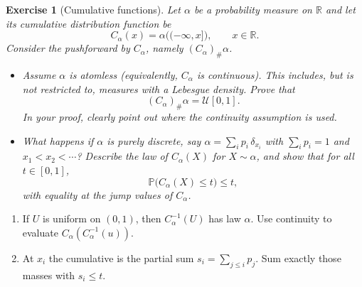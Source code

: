 \documentclass[11pt,a4paper]{article}
\theoremstyle{exostyle}
\newtheorem{exercise}{Exercise}
\newcommand{\push}{\#}
\newcommand{\Unif}{\mathcal U}
\begin{document}
\begin{exercise}[Cumulative functions]\label{ex:PIT}
Let $\alpha$ be a probability measure on $\mathbb{R}$ and let its cumulative distribution function be
\[
C_\alpha(x)=\alpha\bigl((-\infty,x]\bigr),\qquad x\in\mathbb{R}.
\]
Consider the pushforward by $C_\alpha$, namely $(C_\alpha)_{\push}\alpha$.

\begin{itemize}[itemsep=2pt]
\item[(1)] Assume $\alpha$ is atomless (equivalently, $C_\alpha$ is continuous). This includes, but is not restricted to, measures with a Lebesgue density. Prove that
\[
(C_\alpha)_{\push}\alpha=\Unif[0,1].
\]
In your proof, clearly point out \emph{where} the continuity assumption is used.
\item[(2)] What happens if $\alpha$ is purely discrete, say $\alpha=\sum_{i} p_i\,\delta_{x_i}$ with $\sum_i p_i=1$ and $x_1<x_2<\cdots$? Describe the law of $C_\alpha(X)$ for $X\sim\alpha$, and show that for all $t\in[0,1]$,
\[
\mathbb{P}\bigl(C_\alpha(X)\le t\bigr)\le t,
\]
with equality at the jump values of $C_\alpha$.
\end{itemize}
\end{exercise}
\begin{hints}
\begin{enumerate}[label=(\arabic*)]\item If $U$ is uniform on $(0,1)$, then $C_\alpha^{-1}(U)$ has law $\alpha$. Use continuity to evaluate $C_\alpha(C_\alpha^{-1}(u))$.\item At $x_i$ the cumulative is the partial sum $s_i=\sum_{j\le i}p_j$. Sum exactly those masses with $s_i\le t$.\end{enumerate}
\end{hints}
\end{document}
